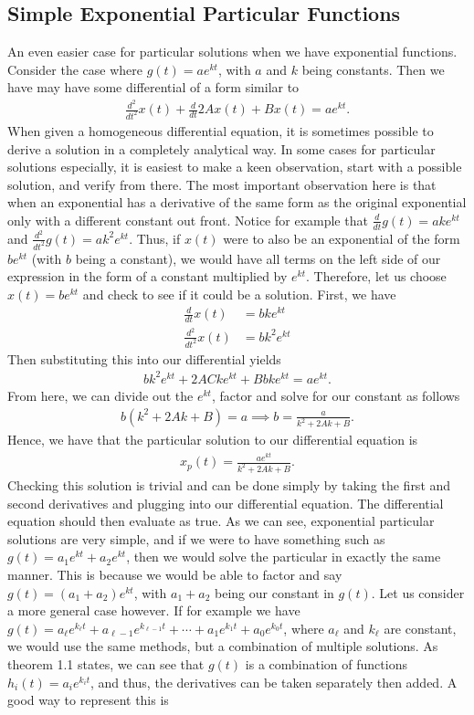 \subsection{Simple Exponential Particular Functions}
An even easier case for particular solutions when we have exponential functions. Consider the case where $g(t)=ae^{kt}$, with $a$ and $k$ being constants. Then we have may have some differential of a form similar to
\begin{align}
\frac{d^2}{dt^2}x(t)+\frac{d}{dt}2Ax(t)+Bx(t)=ae^{kt}.
\end{align}
When given a homogeneous differential equation, it is sometimes possible to derive a solution in a completely analytical way. In some cases for particular solutions especially, it is easiest to make a keen observation, start with a possible solution, and verify from there. The most important observation here is that when an exponential has a derivative of the same form as the original exponential only with a different constant out front. Notice for example that $\frac{d}{dt}g(t)=ake^{kt}$ and $\frac{d^2}{dt^2}g(t)=ak^2e^{kt}$. Thus, if $x(t)$ were to also be an exponential of the form $be^{kt}$ (with $b$ being a constant), we would have all terms on the left side of our expression in the form of a constant multiplied by $e^{kt}$. Therefore, let us choose $x(t)=be^{kt}$ and check to see if it could be a solution. First, we have 
\begin{align}
\frac{d}{dt}x(t)&=bke^{kt} \\
\frac{d^2}{dt^2}x(t)&=bk^2e^{kt}
\end{align}
Then substituting this into our differential yields
\begin{align}
bk^2e^{kt}+2ACke^{kt}+Bbke^{kt}=ae^{kt}.
\end{align}
From here, we can divide out the $e^{kt}$, factor and solve for our constant as follows
\begin{align}
b(k^2+2Ak+B)=a \implies b=\frac{a}{k^2+2Ak+B}.
\end{align}
Hence, we have that the particular solution to our differential equation is
\begin{align}
x_p(t)=\frac{ae^{kt}}{k^2+2Ak+B}.
\end{align}
Checking this solution is trivial and can be done simply by taking the first and second derivatives and plugging into our differential equation. The differential equation should then evaluate as true. As we can see, exponential particular solutions are very simple, and if we were to have something such as $g(t)=a_1e^{kt}+a_2e^{kt}$, then we would solve the particular in exactly the same manner. This is because we would be able to factor and say $g(t)=(a_1+a_2)e^{kt}$, with $a_1+a_2$ being our constant in $g(t)$. Let us consider a more general case however. If for example we have $g(t)=a_\ell e^{k_\ell t}+a_{\ell-1}e^{k_{\ell-1}t}+\cdots+a_1e^{k_1t}+a_0e^{k_0t}$, where $a_\ell$ and $k_\ell$ are constant, we would use the same methods, but a combination of multiple solutions. As theorem 1.1 states, we can see that $g(t)$ is a combination of functions $h_i(t)=a_i e^{k_i t}$, and thus, the derivatives can be taken separately then added. A good way to represent this is
